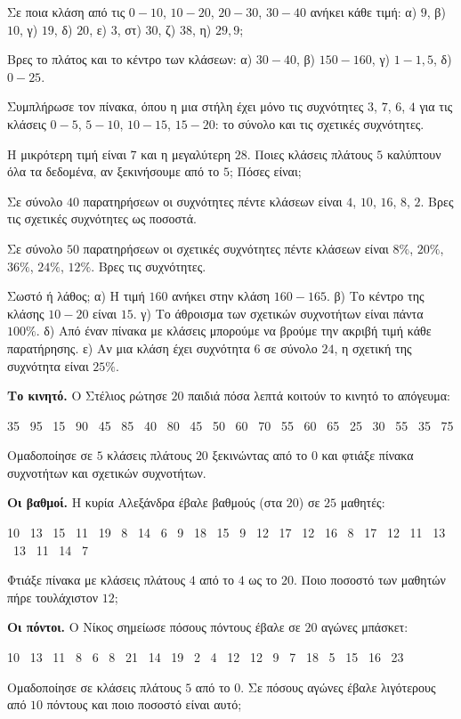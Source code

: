 
\ex Σε ποια κλάση από τις $0-10$, $10-20$, $20-30$, $30-40$ ανήκει κάθε τιμή: α) $9$, β) $10$, γ) $19$, δ) $20$, ε) $3$, στ) $30$, ζ) $38$, η) $29{,}9$;

\ex Βρες το πλάτος και το κέντρο των κλάσεων: α) $30-40$, β) $150-160$, γ) $1-1{,}5$, δ) $0-25$.

\ex Συμπλήρωσε τον πίνακα, όπου η μια στήλη έχει μόνο τις συχνότητες $3$, $7$, $6$, $4$ για τις κλάσεις $0-5$, $5-10$, $10-15$, $15-20$: το σύνολο και τις σχετικές συχνότητες.

\ex Η μικρότερη τιμή είναι $7$ και η μεγαλύτερη $28$. Ποιες κλάσεις πλάτους $5$ καλύπτουν όλα τα δεδομένα, αν ξεκινήσουμε από το $5$; Πόσες είναι;

\ex Σε σύνολο $40$ παρατηρήσεων οι συχνότητες πέντε κλάσεων είναι $4$, $10$, $16$, $8$, $2$. Βρες τις σχετικές συχνότητες ως ποσοστά.

\ex Σε σύνολο $50$ παρατηρήσεων οι σχετικές συχνότητες πέντε κλάσεων είναι $8\%$, $20\%$, $36\%$, $24\%$, $12\%$. Βρες τις συχνότητες.

\ex Σωστό ή λάθος; α) Η τιμή $160$ ανήκει στην κλάση $160-165$. β) Το κέντρο της κλάσης $10-20$ είναι $15$. γ) Το άθροισμα των σχετικών συχνοτήτων είναι πάντα $100\%$. δ) Από έναν πίνακα με κλάσεις μπορούμε να βρούμε την ακριβή τιμή κάθε παρατήρησης. ε) Αν μια κλάση έχει συχνότητα $6$ σε σύνολο $24$, η σχετική της συχνότητα είναι $25\%$.


\ex \textbf{Το κινητό.} Ο Στέλιος ρώτησε $20$ παιδιά πόσα λεπτά κοιτούν το κινητό το απόγευμα:\par
\noindent\mbox{}\hfill 35 \ 95 \ 15 \ 90 \ 45 \ 85 \ 40 \ 80 \ 45 \ 50 \ 60 \ 70 \ 55 \ 60 \ 65 \ 25 \ 30 \ 55 \ 35 \ 75\hfill\mbox{}\par
Ομαδοποίησε σε $5$ κλάσεις πλάτους $20$ ξεκινώντας από το $0$ και φτιάξε πίνακα συχνοτήτων και σχετικών συχνοτήτων.

\ex \textbf{Οι βαθμοί.} Η κυρία Αλεξάνδρα έβαλε βαθμούς (στα $20$) σε $25$ μαθητές:\par
\noindent\mbox{}\hfill 10 \ 13 \ 15 \ 11 \ 19 \ 8 \ 14 \ 6 \ 9 \ 18 \ 15 \ 9 \ 12 \ 17 \ 12 \ 16 \ 8 \ 17 \ 12 \ 11 \ 13 \ 13 \ 11 \ 14 \ 7\hfill\mbox{}\par
Φτιάξε πίνακα με κλάσεις πλάτους $4$ από το $4$ ως το $20$. Ποιο ποσοστό των μαθητών πήρε τουλάχιστον $12$;

\ex \textbf{Οι πόντοι.} Ο Νίκος σημείωσε πόσους πόντους έβαλε σε $20$ αγώνες μπάσκετ:\par
\noindent\mbox{}\hfill 10 \ 13 \ 11 \ 8 \ 6 \ 8 \ 21 \ 14 \ 19 \ 2 \ 4 \ 12 \ 12 \ 9 \ 7 \ 18 \ 5 \ 15 \ 16 \ 23\hfill\mbox{}\par
Ομαδοποίησε σε κλάσεις πλάτους $5$ από το $0$. Σε πόσους αγώνες έβαλε λιγότερους από $10$ πόντους και ποιο ποσοστό είναι αυτό;

